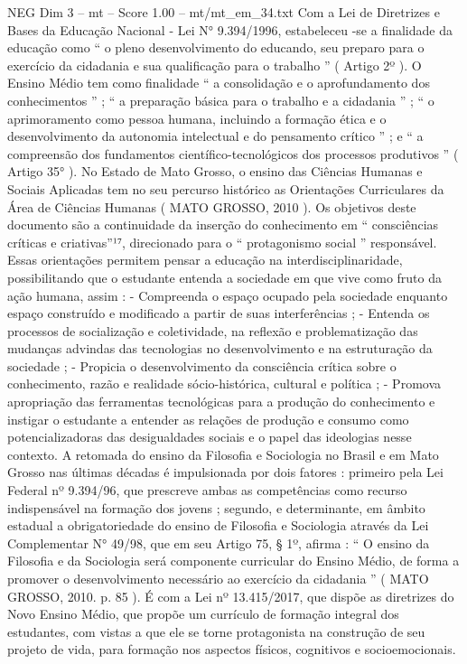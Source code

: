 \begin{textsample}{NEG Dim 3 – mt – Score 1.00 – mt/mt\_em\_34.txt}
Com a Lei de Diretrizes e Bases da Educação Nacional - Lei N{\EmojiFont °} 9.394/1996, estabeleceu -se a finalidade da educação como “ o pleno desenvolvimento do educando, seu preparo para o exercício da cidadania e sua qualificação para o trabalho ” ( Artigo 2º ).
O Ensino Médio tem como finalidade “ a consolidação e o aprofundamento dos conhecimentos ” ; “ a preparação básica para o trabalho e a cidadania ” ; “ o aprimoramento como pessoa humana, incluindo a formação ética e o desenvolvimento da autonomia intelectual e do pensamento crítico ” ; e “ a compreensão dos fundamentos científico-tecnológicos dos processos produtivos ” ( Artigo 35{\EmojiFont °} ).
No Estado de Mato Grosso, o ensino das Ciências Humanas e Sociais Aplicadas tem no seu percurso histórico as Orientações Curriculares da Área de Ciências Humanas ( MATO GROSSO, 2010 ).
Os objetivos deste documento são a continuidade da inserção do conhecimento em “ consciências críticas e criativas”¹⁷, direcionado para o “ protagonismo social ” responsável.
Essas orientações permitem pensar a educação na interdisciplinaridade, possibilitando que o estudante entenda a sociedade em que vive como fruto da ação humana, assim : - Compreenda o espaço ocupado pela sociedade enquanto espaço construído e modificado a partir de suas interferências ; - Entenda os processos de socialização e coletividade, na reflexão e problematização das mudanças advindas das tecnologias no desenvolvimento e na estruturação da sociedade ; - Propicia o desenvolvimento da consciência crítica sobre o conhecimento, razão e realidade sócio-histórica, cultural e política ; - Promova apropriação das ferramentas tecnológicas para a produção do conhecimento e instigar o estudante a entender as relações de produção e consumo como potencializadoras das desigualdades sociais e o papel das ideologias nesse contexto.
A retomada do ensino da Filosofia e Sociologia no Brasil e em Mato Grosso nas últimas décadas é impulsionada por dois fatores : primeiro pela Lei Federal nº 9.394/96, que prescreve ambas as competências como recurso indispensável na formação dos jovens ; segundo, e determinante, em âmbito estadual a obrigatoriedade do ensino de Filosofia e Sociologia através da Lei Complementar N{\EmojiFont °} 49/98, que em seu Artigo 75, § 1º, afirma : “ O ensino da Filosofia e da Sociologia será componente curricular do Ensino Médio, de forma a promover o desenvolvimento necessário ao exercício da cidadania ” ( MATO GROSSO, 2010. p. 85 ).
É com a Lei nº 13.415/2017, que dispõe as diretrizes do Novo Ensino Médio, que propõe um currículo de formação integral dos estudantes, com vistas a que ele se torne protagonista na construção de seu projeto de vida, para formação nos aspectos físicos, cognitivos e socioemocionais.

\end{textsample}
